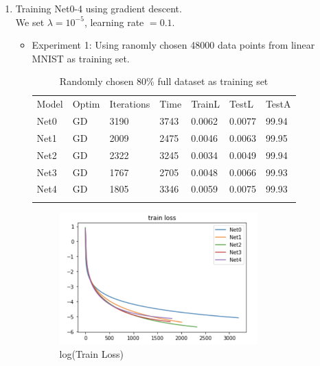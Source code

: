 \newpage
\begin{enumerate}
	\item Training Net0-4 using gradient descent.\\
	We set $\lambda = 10^{-5}$, learning rate $= 0.1$.
	\begin{itemize}
		\item Experiment 1: Using ranomly chosen 48000 data points from linear MNIST as training set.\\
		\begin{table}[H]
			\centering
			\caption{Randomly chosen 80\% full dataset as training set}
			\label{tab:1}      
			\begin{tabular}{lllllll}
				\hline\noalign{\smallskip}
				Model &  Optim & Iterations & Time  & TrainL  & TestL & TestA \\
				\noalign{\smallskip}\hline\noalign{\smallskip}
				
				Net0 & GD & 3190 & 3743 & 0.0062 & 0.0077 & 99.94   \\
				
				Net1 & GD & 2009 & 2475 & 0.0046 & 0.0063 & 99.95 \\
				
				Net2 & GD & 2322 & 3245 & 0.0034 & 0.0049 & 99.94 \\
				
				Net3 & GD & 1767 & 2705 & 0.0048 & 0.0066 & 99.93 \\
				
				Net4 & GD & 1805 & 3346 &0.0059 & 0.0075 & 99.93 \\
				
				\noalign{\smallskip}\hline
				
			\end{tabular}
		\end{table}
		
		\begin{figure}[H]
			\centering
			\includegraphics[width=3in]{figure/logGDtrainL.png}   
			\caption{log(Train Loss)}
		\end{figure}


\end{itemize}
\end{enumerate}
